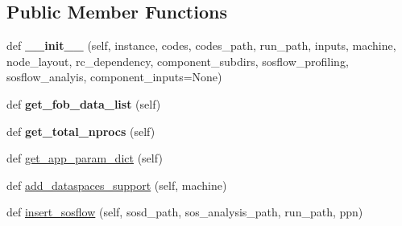 \subsection*{Public Member Functions}
\begin{DoxyCompactItemize}
\item 
\mbox{\label{classcodar_1_1cheetah_1_1model_1_1_run_a6b83070bbd7f8675be9f9ff7e91cadff}} 
def {\bfseries \+\_\+\+\_\+init\+\_\+\+\_\+} (self, instance, codes, codes\+\_\+path, run\+\_\+path, inputs, machine, node\+\_\+layout, rc\+\_\+dependency, component\+\_\+subdirs, sosflow\+\_\+profiling, sosflow\+\_\+analyis, component\+\_\+inputs=None)
\item 
\mbox{\label{classcodar_1_1cheetah_1_1model_1_1_run_a8d10cb20808cc4c66a59f949ec40aeb8}} 
def {\bfseries get\+\_\+fob\+\_\+data\+\_\+list} (self)
\item 
\mbox{\label{classcodar_1_1cheetah_1_1model_1_1_run_af56a27848d2d8b900435b462ac6b74d8}} 
def {\bfseries get\+\_\+total\+\_\+nprocs} (self)
\item 
def \hyperlink{classcodar_1_1cheetah_1_1model_1_1_run_a30df1617b81f2cfcde9f57d443ca25cb}{get\+\_\+app\+\_\+param\+\_\+dict} (self)
\item 
def \hyperlink{classcodar_1_1cheetah_1_1model_1_1_run_a5fc7b380524cfda5c77104b61e4441fd}{add\+\_\+dataspaces\+\_\+support} (self, machine)
\item 
def \hyperlink{classcodar_1_1cheetah_1_1model_1_1_run_a8f4284bf79f8b909c4c2d0ef5319e3bc}{insert\+\_\+sosflow} (self, sosd\+\_\+path, sos\+\_\+analysis\+\_\+path, run\+\_\+path, ppn)
\end{DoxyCompactItemize}
